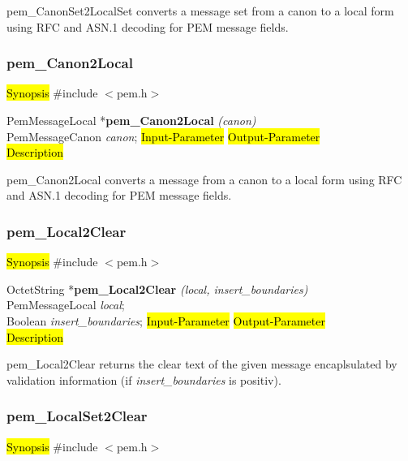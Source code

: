 pem\_CanonSet2LocalSet converts a message set from a canon to a local form
using RFC and ASN.1 decoding for PEM message fields.







\subsubsection{pem\_Canon2Local}
\label{pem_Canon2Local}
\hl{Synopsis}
\#include $<$pem.h$>$ 

PemMessageLocal *{\bf pem\_Canon2Local} {\em (canon)} \\
PemMessageCanon {\em *canon};
\hl{Input-Parameter}
\hl{Output-Parameter}
 \\
\hl{Description}

pem\_Canon2Local converts a message from a canon to a local form
using RFC and ASN.1 decoding for PEM message fields.








\subsubsection{pem\_Local2Clear}
\label{pem_Local2Clear}
\hl{Synopsis}
\#include $<$pem.h$>$ 

OctetString *{\bf pem\_Local2Clear} {\em (local, insert\_boundaries)} \\
PemMessageLocal {\em *local};\\
Boolean {\em insert\_boundaries};
\hl{Input-Parameter}
\hl{Output-Parameter}
 \\
\hl{Description}

pem\_Local2Clear returns the clear text of the given message encaplsulated
by validation information (if {\em insert\_boundaries} is positiv).









\subsubsection{pem\_LocalSet2Clear}
\label{pem_LocalSet2Clear}
\hl{Synopsis}
\#include $<$pem.h$>$ 

